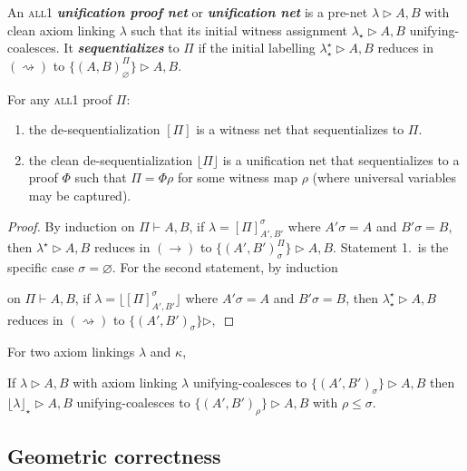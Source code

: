\documentclass[UKenglish]{lipics-v2016}
\theoremstyle{plain}
\newcommand\defn[1]{\textit{\textbf{#1}}}
\newcommand\floor[1]{\lfloor#1\rfloor}
\newcommand\all{\textsc{all}}
\newcommand\+{+}
\renewcommand\*{\times}
\newcommand\prf[3]{#1\vdash\!#2,#3}
\newcommand\net[3]{#1\triangleright #2,#3}
\newcommand\deseq[4][\sigma]{[#2]^{#1}_{#3,#4}}
\newcommand\gen{\leq}
\newcommand\link[3][\sigma]{(#2,#3)_{#1}}
\newcommand\scoal{\rightarrow} %
\newcommand\ucoal{\rightsquigarrow}
\begin{document}
\begin{definition}
An \all1 \defn{unification proof net} or \defn{unification net} is a pre-net $\net\lambda AB$ with clean axiom linking $\lambda$ such that its initial witness assignment $\net{\lambda_\star}AB$ unifying-coalesces. It \defn{sequentializes} to $\Pi$ if the initial labelling $\net{\lambda^\star_\star}AB$ reduces in $(\ucoal)$ to $\net{\{\link[\varnothing]AB^\Pi\}}AB$.
\end{definition}



\begin{theorem}
For any \all1 proof $\Pi$:
\begin{enumerate}
\item the de-sequentialization $[\Pi]$ is a witness net that sequentializes to $\Pi$. 
\item the clean de-sequentialization $\floor\Pi$ is a unification net that sequentializes to a proof $\Phi$ such that $\Pi=\Phi\rho$ for some witness map $\rho$ (where universal variables may be captured).
\end{enumerate}
\end{theorem}

\begin{proof}
By induction on $\prf\Pi AB$, if $\lambda=[\Pi]_{A',B'}^\sigma$ where $A'\sigma=A$ and $B'\sigma=B$, then $\net{\lambda^\star}AB$ reduces in $(\scoal)$ to $\net{\{\link{A'}{B'}^\Pi\}}AB$. Statement 1.\ is the specific case $\sigma=\varnothing$.
%
%
For the second statement, by induction 


 on $\prf\Pi AB$, if $\lambda=\floor{\deseq\Pi{A'}{B'}}$ where $A'\sigma=A$ and $B'\sigma=B$, then $\net{\lambda^\star_\star}AB$ reduces in $(\ucoal)$ to $\net{\{\link{A'}{B'}\}}{}{}$
\end{proof}

For two axiom linkings $\lambda$ and $\kappa$, 

\begin{lemma}
If $\net\lambda AB$ with axiom linking $\lambda$ unifying-coalesces to $\net{\{\link{A'}{B'}\}}AB$ then $\net{\floor\lambda_\star}AB$ unifying-coalesces to $\net{\{\link[\rho]{A'}{B'}\}}AB$ with $\rho\gen\sigma$.
\end{lemma}





\subsection{Geometric correctness}
\end{document}
